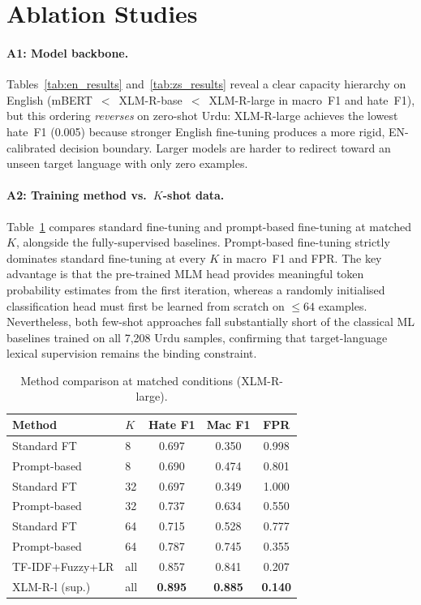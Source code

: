 \documentclass{article}
\begin{document}
\section{Ablation Studies}
\label{sec:ablation}

\paragraph{A1: Model backbone.}
Tables~\ref{tab:en_results} and~\ref{tab:zs_results} reveal a clear capacity
hierarchy on English (mBERT~$<$~XLM-R-base~$<$~XLM-R-large in macro~F1 and hate~F1),
but this ordering \emph{reverses} on zero-shot Urdu: XLM-R-large achieves the
lowest hate~F1 (0.005) because stronger English fine-tuning produces a more rigid,
EN-calibrated decision boundary.
Larger models are harder to redirect toward an unseen target language with only
zero examples.

\paragraph{A2: Training method vs.\ $K$-shot data.}
Table~\ref{tab:ablation} compares standard fine-tuning and prompt-based fine-tuning
at matched $K$, alongside the fully-supervised baselines.
Prompt-based fine-tuning strictly dominates standard fine-tuning at every $K$
in macro~F1 and FPR.
The key advantage is that the pre-trained MLM head provides meaningful token
probability estimates from the first iteration, whereas a randomly initialised
classification head must first be learned from scratch on $\le 64$ examples.
Nevertheless, both few-shot approaches fall substantially short of the classical
ML baselines trained on all 7{,}208 Urdu samples, confirming that target-language
lexical supervision remains the binding constraint.

\begin{table}[h]
\centering
\caption{Method comparison at matched conditions (XLM-R-large).}
\label{tab:ablation}
\vskip 0.05in
\begin{small}
\begin{tabular}{llccc}
\toprule
Method & $K$ & Hate F1 & Mac F1 & FPR \\
\midrule
Standard FT    &  8  & 0.697 & 0.350 & 0.998 \\
Prompt-based   &  8  & 0.690 & 0.474 & 0.801 \\
\midrule
Standard FT    & 32  & 0.697 & 0.349 & 1.000 \\
Prompt-based   & 32  & 0.737 & 0.634 & 0.550 \\
\midrule
Standard FT    & 64  & 0.715 & 0.528 & 0.777 \\
Prompt-based   & 64  & 0.787 & 0.745 & 0.355 \\
\midrule
TF-IDF+Fuzzy+LR & all & 0.857 & 0.841 & 0.207 \\
XLM-R-l (sup.) & all & \textbf{0.895} & \textbf{0.885} & \textbf{0.140} \\
\bottomrule
\end{tabular}
\end{small}
\end{table}
\end{document}
